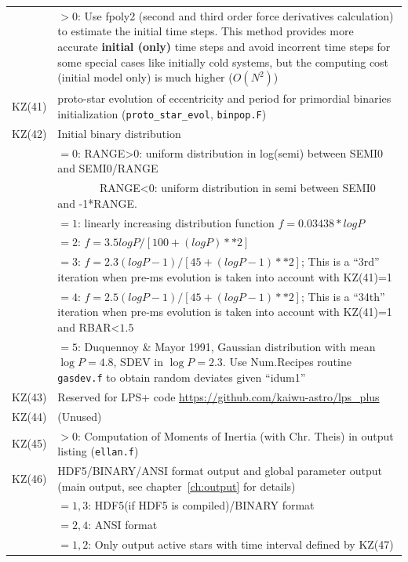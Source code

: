 \begin{longtable}{@{}p{1.5cm}p{13.0cm}}
        & $>0$: Use fpoly2 (second and third order force derivatives calculation) to estimate the initial time steps. This method provides more accurate {\bf initial (only)} time steps and avoid incorrent time steps for some special cases like initially cold systems, but the computing cost (initial model only) is much higher ($O(N^2)$)\\
KZ(41)  & proto-star evolution of eccentricity and period for primordial binaries initialization (\texttt{proto\_star\_evol}, \texttt{binpop.F}) \\
KZ(42)  & Initial binary distribution \\
        & $=0$: RANGE>0: uniform distribution in log(semi) between SEMI0 and SEMI0/RANGE \\
        & ~~~~~~~ RANGE<0: uniform distribution in semi between SEMI0 and -1*RANGE. \\
        & $=1$: linearly increasing distribution function $f=0.03438*logP$ \\
        & $=2$: $f=3.5logP/[100+(logP)**2]$ \\
        & $=3$: $f=2.3(logP-1)/[45+(logP-1)**2]$; This is a ``3rd'' iteration when  pre-ms evolution is taken into account with KZ(41)=1 \\
        & $=4$: $f=2.5(logP-1)/[45+(logP-1)**2]$; This is a ``34th'' iteration when pre-ms evolution is taken into account with KZ(41)=1 and RBAR<$1.5$ \\
        & $=5$: Duquennoy \& Mayor 1991, Gaussian distribution with mean $\log{P}=4.8$, SDEV in $\log{P}=2.3$. Use Num.Recipes routine \texttt{gasdev.f} to obtain random deviates given ``idum1'' \\
KZ(43)  & Reserved for LPS+ code \url{https://github.com/kaiwu-astro/lps_plus} \\
KZ(44)  & (Unused) \\
KZ(45)  & $>0$: Computation of Moments of Inertia (with Chr. Theis) in output listing (\texttt{ellan.f}) \\
KZ(46)  &  HDF5/BINARY/ANSI format output and global parameter output (main output, see chapter~\ref{ch:output} for details) \\
        &  $=1,3$: HDF5(if HDF5 is compiled)/BINARY format\\
        &  $=2,4$: ANSI format \\
        &  $=1,2$: Only output active stars with time interval defined by KZ(47) \\

\end{longtable}
